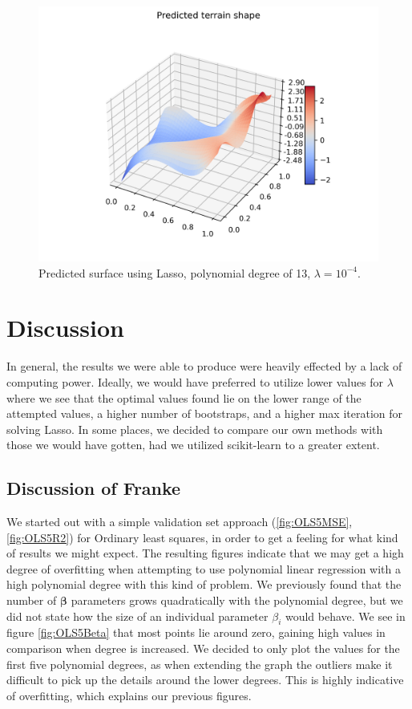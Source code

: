 \documentclass{article}
\begin{document}
\begin{figure}[htbp]
    \centering
    \includegraphics[width=\textwidth]{Project1/figures/Terrain/PredictedSurface.png}
    \caption{Predicted surface using Lasso, polynomial degree of 13, $\lambda=10^{-4}$.}
    \label{fig:PredictedSurface}
\end{figure}


\newpage
\section{Discussion}
In general, the results we were able to produce were heavily effected by a lack of computing power. Ideally, we would have preferred to utilize lower values for $\lambda$ where we see that the optimal values found lie on the lower range of the attempted values, a higher number of bootstraps, and a higher max iteration for solving Lasso. In some places, we decided to compare our own methods with those we would have gotten, had we utilized scikit-learn to a greater extent.

\subsection{Discussion of Franke}
We started out with a simple validation set approach (\ref{fig:OLS5MSE}, \ref{fig:OLS5R2}) for Ordinary least squares, in order to get a feeling for what kind of results we might expect. The resulting figures indicate that we may get a high degree of overfitting when attempting to use polynomial linear regression with a high polynomial degree with this kind of problem. We previously found that the number of $\boldsymbol{\beta}$ parameters grows quadratically with the polynomial degree, but we did not state how the size of an individual parameter $\beta_i$ would behave. We see in figure \ref{fig:OLS5Beta} that most points lie around zero, gaining high values in comparison when degree is increased. We decided to only plot the values for the first five polynomial degrees, as when extending the graph the outliers make it difficult to pick up the details around the lower degrees. This is highly indicative of overfitting, which explains our previous figures.
\end{document}
